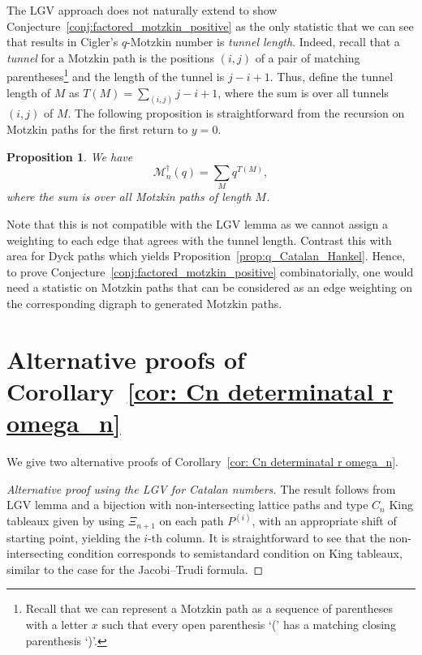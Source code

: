 \documentclass[11pt, leqno]{amsart}
\theoremstyle{plain}
\newtheorem{proposition}[theorem]{Proposition}
\theoremstyle{definition}
\numberwithin{equation}{section}
\newcommand{\Mot}{\mathcal{M}} %
\newcommand{\defn}[1]{{\color{darkred}\emph{#1}}} %
\begin{document}
The LGV approach does not naturally extend to show Conjecture~\ref{conj:factored_motzkin_positive} as the only statistic that we can see that results in Cigler's $q$-Motzkin number is \defn{tunnel length}. Indeed, recall that a \defn{tunnel} for a Motzkin path is the positions $(i, j)$ of a pair of matching parentheses\footnote{Recall that we can represent a Motzkin path as a sequence of parentheses with a letter $x$ such that every open parenthesis `(' has a matching closing parenthesis `)'.} and the length of the tunnel is $j - i + 1$. Thus, define the tunnel length of $M$ as $T(M) = \sum_{(i,j)} j - i + 1$, where the sum is over all tunnels $(i,j)$ of $M$. The following proposition is straightforward from the recursion on Motzkin paths for the first return to $y=0$.

\begin{proposition}
We have
\[
\Mot^{\dagger}_n(q) = \sum_M q^{T(M)},
\]
where the sum is over all Motzkin paths of length $M$.
\end{proposition}

Note that this is not compatible with the LGV lemma as we cannot assign a weighting to each edge that agrees with the tunnel length. Contrast this with area for Dyck paths which yields Proposition~\ref{prop:q_Catalan_Hankel}. Hence, to prove Conjecture~\ref{conj:factored_motzkin_positive} combinatorially, one would need a statistic on Motzkin paths that can be considered as an edge weighting on the corresponding digraph to generated Motzkin paths.








\section{Alternative proofs of Corollary~\ref{cor: Cn determinatal r omega_n}}
\label{app:alt_proofs}

We give two alternative proofs of Corollary~\ref{cor: Cn determinatal r omega_n}.

\begin{proof}[Alternative proof using the LGV for Catalan numbers]
The result follows from LGV lemma and a bijection with non-intersecting lattice paths and type $C_n$ King tableaux given by using $\Xi_{n+1}$ on each path $P^{(i)}$, with an appropriate shift of starting point, yielding the $i$-th column. It is straightforward to see that the non-intersecting condition corresponds to semistandard condition on King tableaux, similar to the case for the Jacobi--Trudi formula.
\end{proof}
\end{document}
